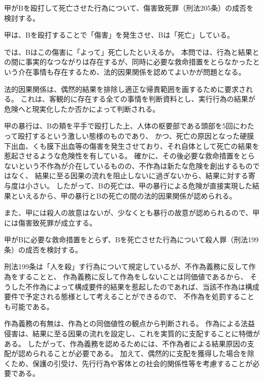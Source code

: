 \documentclass[11pt]{jsarticle}
\title{\vspace{-30mm}{\textgt{\Large{\fbox{3} ヒモ生活の果てに}}}}
\date{\vspace{-15mm}}
\begin{document}
\maketitle


	\sectionB{}
	甲がBを殴打して死亡させた行為について、傷害致死罪（刑法205条）の成否を検討する。
	
		\sectionC{}
		甲は、Bを殴打することで「傷害」を発生させ、Bは「死亡」している。
		
		\sectionC{}
		では、Bはこの傷害に「よって」死亡したといえるか。
		本問では、行為と結果との間に事実的なつながりは存在するが、同時に必要な救命措置をとらなかったという介在事情も存在するため、法的因果関係を認めてよいかが問題となる。
		
		法的因果関係は、偶然的結果を排除し適正な帰責範囲を画するために要求される。
		これは、客観的に存在する全ての事情を判断資料とし、実行行為の結果が危険へと現実化したか否かによって判断される。
		
		甲の暴行は、Bの頬を平手で殴打した上、人体の枢要部である頭部を5回にわたって殴打するという激しい態様のものであり、
		かつ、死亡の原因となった硬膜下出血、くも膜下出血等の傷害を発生させており、それ自体として死亡の結果を惹起させるような危険性を有している。
		確かに、その後必要な救命措置をとらないという不作為が介在しているものの、不作為は新たな危険を創出するものではなく、
		結果に至る因果の流れを阻止しないに過ぎないから、結果に対する寄与度は小さい。
		したがって、Bの死亡は、甲の暴行による危険が直接実現した結果といえるから、甲の暴行とBの死亡の間の法的因果関係が認められる。
		
		\sectionC{}
		また、甲には殺人の故意はないが、少なくとも暴行の故意が認められるので、甲には傷害致死罪が成立する。
	
	\sectionB{}
	甲がBに必要な救命措置をとらず、Bを死亡させた行為について殺人罪（刑法199条）の成否を検討する。
	
		\sectionC{}
		刑法199条は「人を殺」す行為について規定しているが、不作為義務に反して作為をすることと、
		作為義務に反して作為をしないことは同価値であるから、
		そうした不作為によって構成要件的結果を惹起したのであれば、当該不作為は構成要件で予定される態様として考えることができるので、
		不作為を処罰することも可能である。
		
		作為義務の有無は、作為との同価値性の観点から判断される。
		作為による法益侵害は、結果に至る因果の流れを設定し、これを実質的に支配することに特徴がある。
		したがって、作為義務を認めるためには、不作為者による結果原因の支配が認められることが必要である。
		加えて、偶然的に支配を獲得した場合を除くため、保護の引受け、先行行為や客体との社会的関係性等を考慮することが必要である。
		
\end{document}
